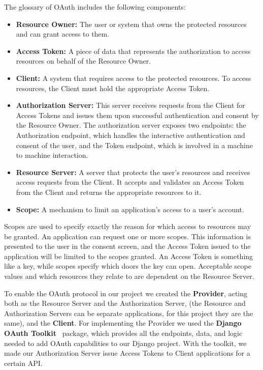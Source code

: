 The glossary of OAuth includes the following components:
\begin{itemize}

	\item \textbf{Resource Owner:} The user or system that owns the protected resources and can grant access to them.

	\item \textbf{Access Token:} A piece of data that represents the authorization to access resources on behalf of the Resource Owner.

	\item \textbf{Client:} A system that requires access to the protected resources. To access resources, the Client must hold the appropriate Access Token.

	\item \textbf{Authorization Server:} This server receives requests from the Client for Access Tokens and issues them upon successful authentication and consent by the Resource Owner. The authorization server exposes two endpoints: the Authorization endpoint, which handles the interactive authentication and consent of the user, and the Token endpoint, which is involved in a machine to machine interaction.

	\item \textbf{Resource Server:} A server that protects the user’s resources and receives access requests from the Client. It accepts and validates an Access Token from the Client and returns the appropriate resources to it.

	\item \textbf{Scope:} A mechanism to limit an application's access to a user's account.

\end{itemize}

Scopes are used to specify exactly the reason for which access to resources may be granted. An application can request one or more scopes. This information is presented to the user in the consent screen, and the Access Token issued to the application will be limited to the scopes granted. An Access Token is something like a key, while scopes specify which doors the key can open. Acceptable scope values and which resources they relate to are dependent on the Resource Server.

To enable the OAuth protocol in our project we created the \textbf{Provider}, acting both as the Resource Server and the Authorization Server, (the Resource and Authorization Servers can be separate applications, for this project they are the same), and the \textbf{Client}.
For implementing the Provider we used the \textbf{Django OAuth Toolkit}~\cite{oauthtoolkit} package, which provides all the endpoints, data, and logic needed to add OAuth capabilities to our Django project.
With the toolkit, we made our Authorization Server issue Access Tokens to Client applications for a certain API.


